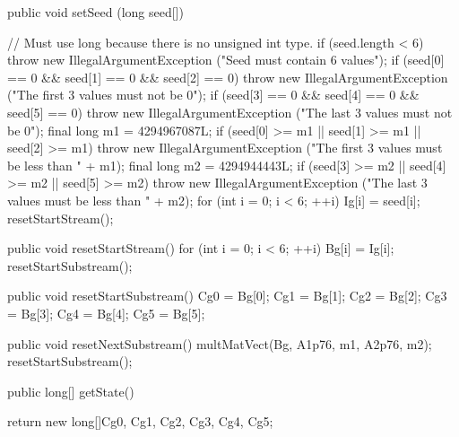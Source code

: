 \begin{code}

   public void setSeed (long seed[]) \begin{hide} {
      // Must use long because there is no unsigned int type.
      if (seed.length < 6)
         throw new IllegalArgumentException ("Seed must contain 6 values");
      if (seed[0] == 0 && seed[1] == 0 && seed[2] == 0)
         throw new IllegalArgumentException
            ("The first 3 values must not be 0");
      if (seed[3] == 0 && seed[4] == 0 && seed[5] == 0)
         throw new IllegalArgumentException
            ("The last 3 values must not be 0");
      final long m1 = 4294967087L;
      if (seed[0] >= m1 || seed[1] >= m1 || seed[2] >= m1)
         throw new IllegalArgumentException
            ("The first 3 values must be less than " + m1);
      final long m2 = 4294944443L;
      if (seed[3] >= m2 || seed[4] >= m2 || seed[5] >= m2)
         throw new IllegalArgumentException
            ("The last 3 values must be less than " + m2);
      for (int i = 0; i < 6;  ++i)
         Ig[i] = seed[i];
      resetStartStream();
   }\end{hide}
\end{code}
\iffalse
 \begin{tabb}  Sets the initial seed $I_g$ of this stream
  to the vector \texttt{seed[0..5]}.  This vector must satisfy the same
  conditions as in \texttt{setPackageSeed}.
  The stream is then reset to this initial seed.
  The states and seeds of the other streams are not modified.
  As a result, after calling this method, the initial seeds
  of the streams are no longer spaced $Z$ values apart.
  For this reason, \emph{this method should be used only in very
  exceptional situations} (I have never used it myself!);
  proper use of \texttt{reset...}
  and of the stream constructor is preferable.
 \end{tabb}
\fi
\begin{htmlonly}
\end{htmlonly}
\begin{code}
\begin{hide}
   public void resetStartStream()  {
      for (int i = 0; i < 6;  ++i)
         Bg[i] = Ig[i];
      resetStartSubstream();
   }

   public void resetStartSubstream()  {
      Cg0 = Bg[0];
      Cg1 = Bg[1];
      Cg2 = Bg[2];
      Cg3 = Bg[3];
      Cg4 = Bg[4];
      Cg5 = Bg[5];
   }

   public void resetNextSubstream()  {
      multMatVect(Bg, A1p76, m1, A2p76, m2);
      resetStartSubstream();
   }

\end{hide}
   public long[] getState() \begin{hide} {
      return new long[]{Cg0, Cg1, Cg2, Cg3, Cg4, Cg5};
   } \end{hide}
\end{code}
